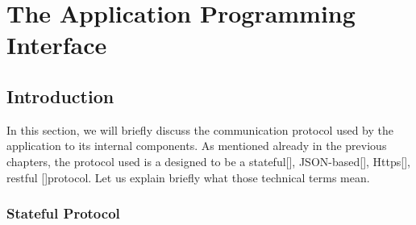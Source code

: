 \chapter{The Application Programming Interface}
\label{API}
	\section{Introduction}
		In this section, we will briefly discuss the communication protocol used by the application to its internal components. 
		As mentioned already in the previous chapters, the protocol used is a designed to be a stateful[\cite{session-rfc6265}], 
		JSON-based[\cite{json-rfc7159}], Https[\cite{rfc2818}], restful [\cite{restful-rfc7231}]protocol. Let us explain briefly 
		what those technical terms mean.
		\subsection{Stateful Protocol}
			
